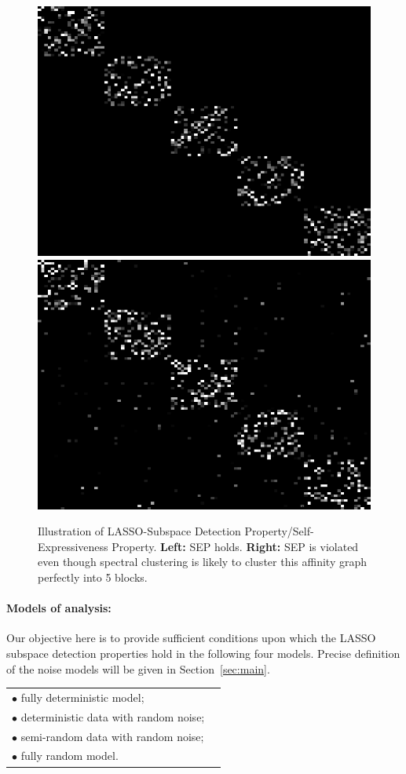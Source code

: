 \documentclass[main]{subfiles}
\begin{document}
\begin{figure}
  \centering
  \includegraphics[width=0.35\linewidth]{pics/SEP.png}
  \includegraphics[width=0.35\linewidth]{pics/ViolateSEP.png}\\
  \caption{Illustration of LASSO-Subspace Detection Property/Self-Expressiveness Property. \textbf{Left:} SEP holds. \textbf{Right:} SEP is violated even though spectral clustering is likely to cluster this affinity graph perfectly into 5 blocks.}\label{fig:SEP}
\end{figure}

\paragraph{Models of analysis: }
Our objective here is to provide sufficient conditions upon which the LASSO subspace detection properties hold in the following four models. Precise definition of the noise models will be given in Section~\ref{sec:main}.

\begin{tabular}{ll}
  $\bullet$ fully deterministic model;\\
  $\bullet$ deterministic data with random noise;\\
  $\bullet$ semi-random data with random noise;\\
  $\bullet$ fully random model.
\end{tabular}
\end{document}
